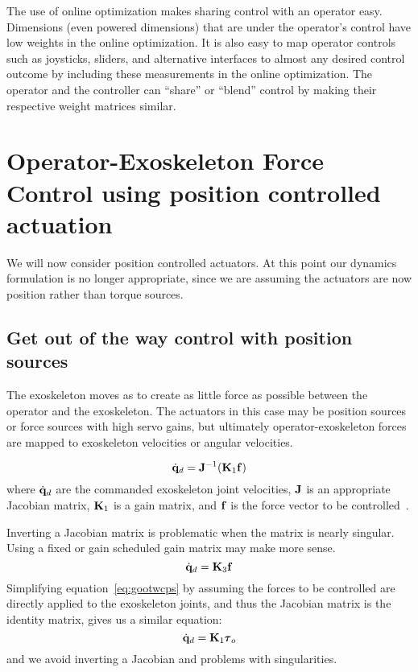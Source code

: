 \documentclass[letterpaper,12pt,fullpage]{article}
\begin{document}
The use of online optimization makes sharing control with an operator easy.
Dimensions (even powered dimensions) that are under the operator's control have
low weights in the online optimization. It is also easy to map operator controls
such as joysticks, sliders, and alternative interfaces to almost any desired
control outcome by including these measurements in the online optimization.
The operator and the controller can ``share'' or ``blend''
control by making their respective
weight matrices similar.

\section{Operator-Exoskeleton Force Control using position controlled actuation}

We will now consider position controlled actuators.
At this point our dynamics formulation is no longer appropriate, since we
are assuming the actuators are now position rather than torque sources.

\subsection{Get out of the way control with position sources}

The exoskeleton moves as to create as little force as possible between the
operator and the exoskeleton. The actuators in this case may be position sources or
force sources with high servo gains,
but ultimately operator-exoskeleton forces are mapped
to exoskeleton velocities or angular velocities.

\begin{equation}
\dot{{\bf q}}_d = {\bf J}^{-1} ({\bf K}_1 {\bf f})
\label{eq:gootwcps}
\end{equation}
where $\dot{{\bf q}}_d$ are the commanded exoskeleton joint velocities,
${\bf J}$ is an appropriate Jacobian matrix, ${\bf K}_1$ is a gain matrix,
and ${\bf f}$ is the force vector to be controlled~\cite{IEEE06990981}.

Inverting a Jacobian matrix is problematic when the matrix is
nearly singular.
Using a fixed or gain scheduled gain matrix may make more sense.
\begin{equation}
\dot{{\bf q}}_d = {\bf K}_3 {\bf f}
\end{equation}
Simplifying equation~\ref{eq:gootwcps}
by assuming the forces to be controlled
are directly applied to the exoskeleton joints, and thus the Jacobian matrix
is the identity matrix, gives us a similar equation:
\begin{equation}
\dot{\vq}_d = \mK_1 \vtau_o
\end{equation}
and we avoid inverting a Jacobian and problems with singularities.
\end{document}
